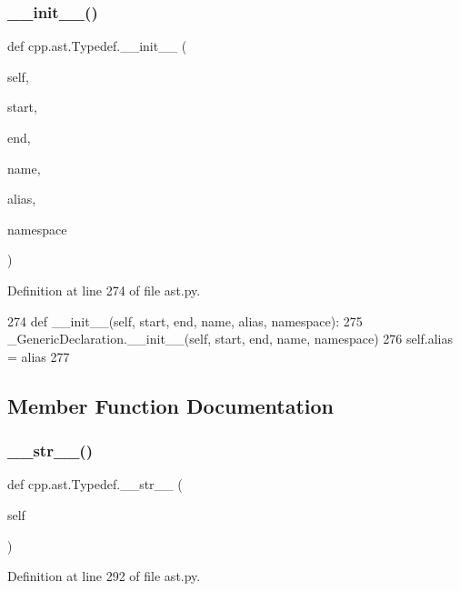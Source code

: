 \subsubsection{\texorpdfstring{\+\_\+\+\_\+init\+\_\+\+\_\+()}{\_\_init\_\_()}}
{\footnotesize\ttfamily def cpp.\+ast.\+Typedef.\+\_\+\+\_\+init\+\_\+\+\_\+ (\begin{DoxyParamCaption}\item[{}]{self,  }\item[{}]{start,  }\item[{}]{end,  }\item[{}]{name,  }\item[{}]{alias,  }\item[{}]{namespace }\end{DoxyParamCaption})}



Definition at line 274 of file ast.\+py.


\begin{DoxyCode}
274     \textcolor{keyword}{def }\_\_init\_\_(self, start, end, name, alias, namespace):
275         \_GenericDeclaration.\_\_init\_\_(self, start, end, name, namespace)
276         self.alias = alias
277 
\end{DoxyCode}


\subsection{Member Function Documentation}
\mbox{\label{classcpp_1_1ast_1_1Typedef_a451920900affc5f12e38ab8fbf5e3dea}} 
\subsubsection{\texorpdfstring{\+\_\+\+\_\+str\+\_\+\+\_\+()}{\_\_str\_\_()}}
{\footnotesize\ttfamily def cpp.\+ast.\+Typedef.\+\_\+\+\_\+str\+\_\+\+\_\+ (\begin{DoxyParamCaption}\item[{}]{self }\end{DoxyParamCaption})}



Definition at line 292 of file ast.\+py.



